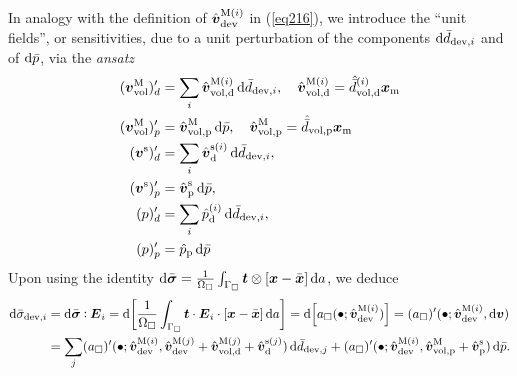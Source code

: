 \documentclass[10pt,a4paper]{article}
\newcommand{\ded}{\mathrm{d}}
\newcommand{\dep}{\mathrm{p}}
\begin{document}
In analogy with the definition of $\hat{\boldsymbol{v}}^{\mathrm{M}(i)}_{\mathrm{dev}}$
in (\ref{eq216}), we introduce the ``unit fields'', or sensitivities, due to a unit perturbation of the components $\operatorname{d \!}\bar{d}_{\mathrm{dev},i}$ and of $\operatorname{d \!}\bar{p}$, via the \emph{ansatz}
\begin{align}
    (\ta{v}^\macro_\vol)'_d
    & = 
    \sum_{i}\hat{\ta{v}}^{\macro(i)}_{\vol,\ded} \dif\bar{d}_{\dev,i}, \quad
    \hat{\ta{v}}^{\macro(i)}_{\vol,\ded} = \hat{\bar{d}}^{(i)}_{\vol,\ded}\ta{x}_\mean
\label{eq221a} \\
    (\ta{v}^\macro_\vol)'_p
    & = 
    \hat{\ta{v}}^{\macro}_{\vol,\dep} \dif\bar{p}, \quad
    \hat{\ta{v}}^{\macro}_{\vol,\dep} = \hat{\bar{d}}_{\vol,\dep}\ta{x}_\mean
\label{eq221b} \\
    (\ta{v}^\fluct)'_d
    & = 
    \sum_{i}\hat{\ta{v}}^{\fluct(i)}_\ded\dif\bar{d}_{\dev,i},
\label{eq222a} \\
    (\ta{v}^\fluct)'_p
    & = 
    \hat{\ta{v}}^{\fluct}_\dep\dif\bar{p},
\label{eq222b} \\
    (p)'_d
    & = 
    \sum_{i}\hat{p}^{(i)}_\ded\dif\bar{d}_{\dev,i},
\label{eq223a} \\
    (p)'_p
    & = 
    \hat{p}_\dep\dif\bar{p}
\label{eq223b}
\end{align}
Upon using the identity $\operatorname{d \!}\bar{\boldsymbol{\sigma}}=\frac{1}{\Omega_\Box} \int_{\Gamma_\Box} \boldsymbol{t} \mathbin{\otimes} [\boldsymbol{x} - \bar{\boldsymbol{x}}]\operatorname{d \!} a$, we deduce
\begin{align}
    \dif\bar{\sigma}_{\dev,i}
    & = 
    \dif\bar{\ts\sigma}\dprod \ts E_i 
    =
    \dif\left[\frac{1}{\Omega_\Box} \int_{\Gamma_\Box} \ts t \cdot \ts E_i \cdot [\ta x - \bar{\ta x}]\dif a\right]
    =
    \dif\left[a_\Box(\bullet; \hat{\ta{v}}^{\macro(i)}_\dev)\right] = ({a}_\Box)'(\bullet; \hat{\ta{v}}^{\macro(i)}_\dev,\dif\ta{v})
    \nonumber \\
    & = 
    \sum_{j}
    (a_\Box)'(\bullet;\hat{\ta{v}}^{\macro(i)}_\dev,\hat{\ta{v}}^{\macro(j)}_\dev +
    \hat{\ta{v}}^{\macro(j)}_{\vol,\ded} +
    \hat{\ta{v}}^{\fluct(j)}_\ded)
    \dif\bar{d}_{\dev,j}
    + (a_\Box)'(\bullet;\hat{\ta{v}}^{\macro(i)}_\dev,\hat{\ta{v}}^{\macro}_{\vol,\dep} +
    \hat{\ta{v}}^{\fluct}_\dep)
    \dif\bar{p}.
    \label{eq219}
\end{align}
\end{document}
